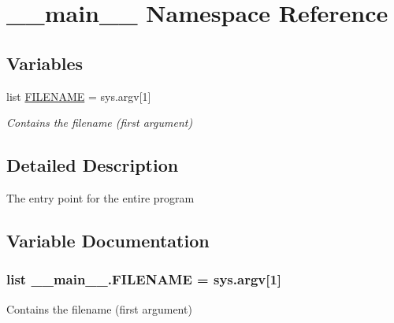 \hypertarget{namespace____main____}{\section{\-\_\-\-\_\-main\-\_\-\-\_\- Namespace Reference}
\label{namespace____main____}
}
\subsection*{Variables}
\begin{DoxyCompactItemize}
\item 
list \hyperlink{namespace____main_____a60e0b299451a8e14940f59935c617486}{F\-I\-L\-E\-N\-A\-M\-E} = sys.\-argv\mbox{[}1\mbox{]}
\begin{DoxyCompactList}\small\item\em Contains the filename (first argument) \end{DoxyCompactList}\end{DoxyCompactItemize}


\subsection{Detailed Description}
\begin{DoxyVerb}The entry point for the entire program     
\end{DoxyVerb}
 

\subsection{Variable Documentation}
\hypertarget{namespace____main_____a60e0b299451a8e14940f59935c617486}{
\subsubsection[{F\-I\-L\-E\-N\-A\-M\-E}]{\setlength{\rightskip}{0pt plus 5cm}list \-\_\-\-\_\-main\-\_\-\-\_\-.\-F\-I\-L\-E\-N\-A\-M\-E = sys.\-argv\mbox{[}1\mbox{]}}}\label{namespace____main_____a60e0b299451a8e14940f59935c617486}


Contains the filename (first argument) 

